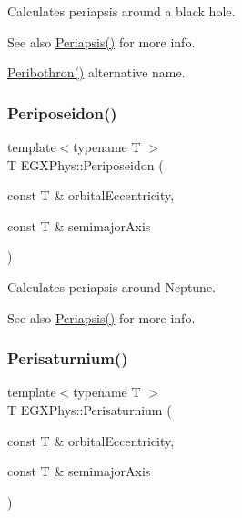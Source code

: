 Calculates periapsis around a black hole. 

\begin{DoxySeeAlso}{See also}
\hyperlink{group___periapsis_ga4414ac75539371ec874a3d25cad6c9fe}{Periapsis()} for more info. 

\hyperlink{group___periapsis_gada5892309279a3a687c4eb2f88238e4e}{Peribothron()} alternative name. 
\end{DoxySeeAlso}
\mbox{\label{group___periapsis_ga237e7af3794202c67e65f64f4c8abc2a}} 
\subsubsection{\texorpdfstring{Periposeidon()}{Periposeidon()}}
{\footnotesize\ttfamily template$<$typename T $>$ \\
T E\+G\+X\+Phys\+::\+Periposeidon (\begin{DoxyParamCaption}\item[{const T \&}]{orbital\+Eccentricity,  }\item[{const T \&}]{semimajor\+Axis }\end{DoxyParamCaption})}



Calculates periapsis around Neptune. 

\begin{DoxySeeAlso}{See also}
\hyperlink{group___periapsis_ga4414ac75539371ec874a3d25cad6c9fe}{Periapsis()} for more info. 
\end{DoxySeeAlso}
\mbox{\label{group___periapsis_ga60a50d09d29ebe47cbbfc125c2ea42bf}} 
\subsubsection{\texorpdfstring{Perisaturnium()}{Perisaturnium()}}
{\footnotesize\ttfamily template$<$typename T $>$ \\
T E\+G\+X\+Phys\+::\+Perisaturnium (\begin{DoxyParamCaption}\item[{const T \&}]{orbital\+Eccentricity,  }\item[{const T \&}]{semimajor\+Axis }\end{DoxyParamCaption})}



